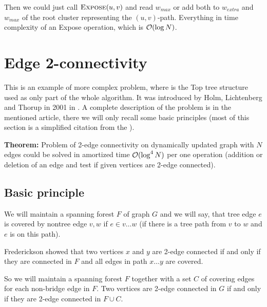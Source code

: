 Then we could just call $\hbox{\sc Expose}(u,v)$ and read $w_{max}$ or add both to
$w_{extra}$ and $w_{max}$ of the root cluster representing the $(u,v)$-path.
Everything in time complexity of an {\sc Expose} operation, which is ${\cal O}(\log
N)$.




\section{Edge 2-connectivity}
\label{sec:edge_2_connectivity}

This is an example of more complex problem, where is the Top tree structure used
as only part of the whole algorithm. It was introduced by Holm, Lichtenberg and
Thorup in 2001 in \cite{PolylogarithmicAlgorithmsForConnectivity}. A complete
description of the problem is in the mentioned article, there we will only
recall some basic principles (most of this section is a simplified citation from
the \cite{PolylogarithmicAlgorithmsForConnectivity}).

\noindent
{\bf Theorem:} Problem of 2-edge connectivity on dynamically updated graph with
$N$ edges could be solved in amortized time ${\cal O}(\log^4 N)$ per one operation
(addition or deletion of an edge and test if given vertices are 2-edge
connected).

\subsection{Basic principle}

We will maintain a spanning forest $F$ of graph $G$ and we will say, that tree
edge $e$ is {\I covered} by nontree edge $v,w$ if $e \in v\dots w$ (if there is
a tree path from $v$ to $w$ and $e$ is on this path).

Frederickson showed that two vertices $x$ and $y$ are 2-edge connected if and
only if they are connected in $F$ and all edges in path $x\dots y$ are covered.

So we will maintain a spanning forest $F$ together with a set $C$ of covering
edges for each non-bridge edge in $F$. Two vertices are 2-edge connected in $G$
if and only if they are 2-edge connected in $F\cup C$.

